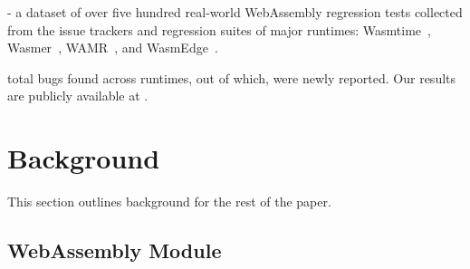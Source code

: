 \documentclass[lettersize,journal]{IEEEtran}
\begin{document}
\begin{packed_itemize}
  \item[\Contrib] 
  \item[\Contrib] 
  \item[\Contrib] \rtbench{} - a dataset of over five hundred real-world WebAssembly regression tests collected from the issue trackers and regression suites of major runtimes: Wasmtime~\cite{wasmtime}, Wasmer~\cite{wasmer}, WAMR~\cite{wamr}, and  WasmEdge~\cite{wasmedge}.
  \item[\Contrib] \textbf{\TotalBugs{}} total bugs found across \BuggyRuntimeCount{} \wasm{} runtimes, out of which,  \textbf{\ReportedBugs{}} were newly reported. Our results are publicly available at \RepoURL{}.
\end{packed_itemize}



\section{Background}
\label{sec:background}

This section outlines background for the rest of the paper.

\subsection{WebAssembly Module}
\label{sec:background_module}
\end{document}
